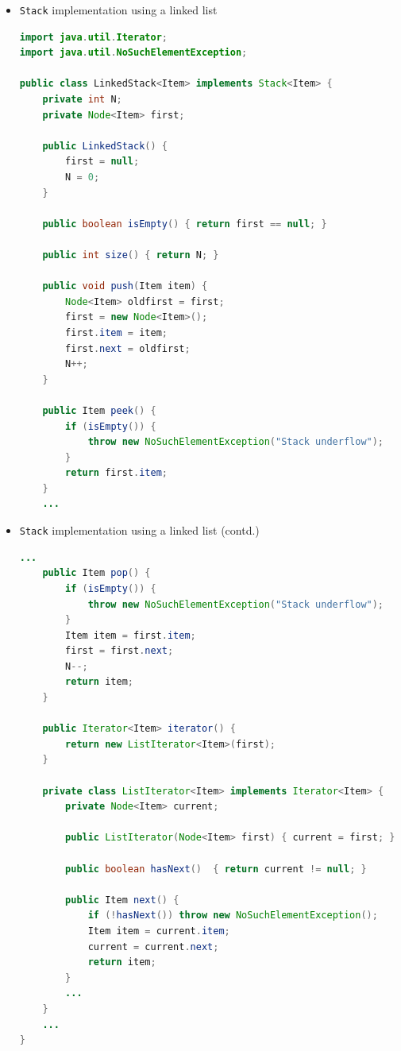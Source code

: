 \documentclass[8pt,a4paper,compress]{beamer}
\begin{document}
\begin{frame}[fragile]
\begin{itemize}
\item \lstinline{Stack} implementation using a linked list
\begin{lstlisting}[language=Java]
import java.util.Iterator;
import java.util.NoSuchElementException;

public class LinkedStack<Item> implements Stack<Item> {
    private int N; 
    private Node<Item> first; 
    
    public LinkedStack() {
        first = null; 
        N = 0;
    }

    public boolean isEmpty() { return first == null; }

    public int size() { return N; }

    public void push(Item item) {
        Node<Item> oldfirst = first;
        first = new Node<Item>(); 
        first.item = item;
        first.next = oldfirst;
        N++;
    }

    public Item peek() {
        if (isEmpty()) { 
            throw new NoSuchElementException("Stack underflow");
        }
        return first.item;
    }
    ...
\end{lstlisting}
\end{itemize}
\end{frame}

\begin{frame}[fragile]
\begin{itemize}
\item \lstinline{Stack} implementation using a linked list (contd.)
\begin{lstlisting}[language=Java]
    ...
    public Item pop() {
        if (isEmpty()) { 
            throw new NoSuchElementException("Stack underflow"); 
        }
        Item item = first.item; 
        first = first.next; 
        N--;
        return item; 
    }

    public Iterator<Item> iterator() { 
        return new ListIterator<Item>(first); 
    }

    private class ListIterator<Item> implements Iterator<Item> {
        private Node<Item> current;

        public ListIterator(Node<Item> first) { current = first; }

        public boolean hasNext()  { return current != null; }

        public Item next() {
            if (!hasNext()) throw new NoSuchElementException();
            Item item = current.item;
            current = current.next; 
            return item;
        }
        ...
    }
    ...
}
\end{lstlisting}
\end{itemize}
\end{frame}
\end{document}
